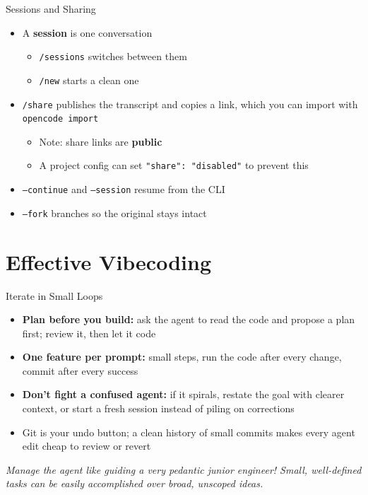 \documentclass[10pt,aspectratio=169]{beamer}
\begin{document}
\begin{frame}[fragile]{Sessions and Sharing}
  \begin{itemize}
    \item A \textbf{session} is one conversation
      \pause
      \begin{itemize}
        \item \texttt{/sessions} switches between them
          \pause
        \item \texttt{/new} starts a clean one
          \pause
      \end{itemize}
    \item \texttt{/share} publishes the transcript and copies a link, which you
      can import with \texttt{opencode import}
      \pause
      \begin{itemize}
        \item Note: share links are \textbf{public}
          \pause
        \item A project config can set \texttt{"share": "disabled"} to prevent
          this
          \pause
      \end{itemize}
    \item \texttt{--continue} and \texttt{--session} resume from the CLI
      \pause
    \item \texttt{--fork} branches so the original stays intact
  \end{itemize}
\end{frame}

\section{Effective Vibecoding}

\begin{frame}{Iterate in Small Loops}
  \begin{itemize}
    \item \textbf{Plan before you build:} ask the agent to read the code and
      propose a plan first; review it, then let it code
      \pause
    \item \textbf{One feature per prompt:} small steps, run the code after
      every change, commit after every success
      \pause
    \item \textbf{Don't fight a confused agent:} if it spirals, restate the
      goal with clearer context, or start a fresh session instead of piling on
      corrections
      \pause
    \item Git is your undo button; a clean history of small commits makes every
      agent edit cheap to review or revert
      \pause
  \end{itemize}
  \vspace{0.8em}
  \centering
  \textit{Manage the agent like guiding a \emph{very} pedantic junior engineer!
  Small, well-defined tasks can be easily accomplished over broad, unscoped
  ideas.}
\end{frame}
\end{document}
